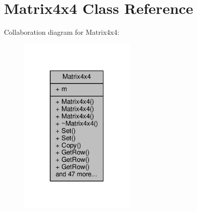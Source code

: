 \hypertarget{classMatrix4x4}{}\section{Matrix4x4 Class Reference}
\label{classMatrix4x4}


Collaboration diagram for Matrix4x4\+:
\nopagebreak
\begin{figure}[H]
\begin{center}
\leavevmode
\includegraphics[width=160pt]{d1/dde/classMatrix4x4__coll__graph}
\end{center}
\end{figure}
